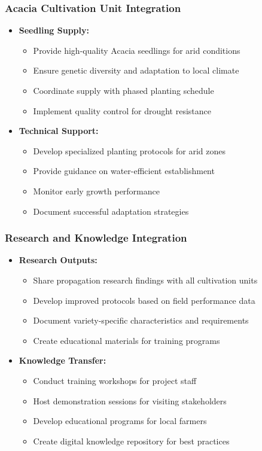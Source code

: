 \subsubsection{Acacia Cultivation Unit Integration}
\begin{itemize}
    \item \textbf{Seedling Supply:}
    \begin{itemize}
        \item Provide high-quality Acacia seedlings for arid conditions
        \item Ensure genetic diversity and adaptation to local climate
        \item Coordinate supply with phased planting schedule
        \item Implement quality control for drought resistance
    \end{itemize}
    
    \item \textbf{Technical Support:}
    \begin{itemize}
        \item Develop specialized planting protocols for arid zones
        \item Provide guidance on water-efficient establishment
        \item Monitor early growth performance
        \item Document successful adaptation strategies
    \end{itemize}
\end{itemize}

\subsubsection{Research and Knowledge Integration}
\begin{itemize}
    \item \textbf{Research Outputs:}
    \begin{itemize}
        \item Share propagation research findings with all cultivation units
        \item Develop improved protocols based on field performance data
        \item Document variety-specific characteristics and requirements
        \item Create educational materials for training programs
    \end{itemize}
    
    \item \textbf{Knowledge Transfer:}
    \begin{itemize}
        \item Conduct training workshops for project staff
        \item Host demonstration sessions for visiting stakeholders
        \item Develop educational programs for local farmers
        \item Create digital knowledge repository for best practices
    \end{itemize}
\end{itemize}

